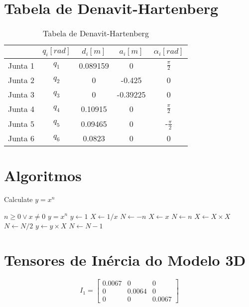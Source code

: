  


\section{Tabela de Denavit-Hartenberg}

\begin{table}[ht]
\centering
\begin{tabular}[t]{lcccc}
\toprule
 &$q_i [rad]$ &$d_i [m]$ &$a_i [m]$ &$\alpha_i [rad]$\\
\midrule
Junta 1& $q_1$& 0.089159&0&$\frac{\pi}{2}$\\
Junta 2& $q_2$& 0 &-0.425&0\\
Junta 3& $q_3$& 0 &-0.39225&0\\
Junta 4& $q_4$& 0.10915 &0&$\frac{\pi}{2}$\\
Junta 5& $q_5$& 0.09465 &0&-$\frac{\pi}{2}$\\
Junta 6& $q_6$& 0.0823 &0&0\\
\bottomrule
\end{tabular}
\caption{Tabela de Denavit-Hartenberg}
\end{table}%

\section{Algoritmos}

\begin{algorithm}[H]
\caption{Calculate $y = x^n$}
\begin{algorithmic}
\REQUIRE $n \geq 0 \vee x \neq 0$
\ENSURE $y = x^n$
\STATE $y \leftarrow 1$
\STATE $X \leftarrow 1 / x$
\STATE $N \leftarrow -n$
\ELSE
\STATE $X \leftarrow x$
\STATE $N \leftarrow n$
\ENDIF
{}
\STATE $X \leftarrow X \times X$
\STATE $N \leftarrow N / 2$
\ELSE[$N$ is odd]
\STATE $y \leftarrow y \times X$
\STATE $N \leftarrow N - 1$
\ENDIF
\ENDWHILE
\end{algorithmic}
\end{algorithm}

\section{Tensores de Inércia do Modelo 3D}

\begin{equation}
I_{1} = 
\begin{bmatrix}
0.0067 & 0 & 0\\
0 & 0.0064 & 0\\
0 & 0 & 0.0067
\end{bmatrix}
\end{equation}

